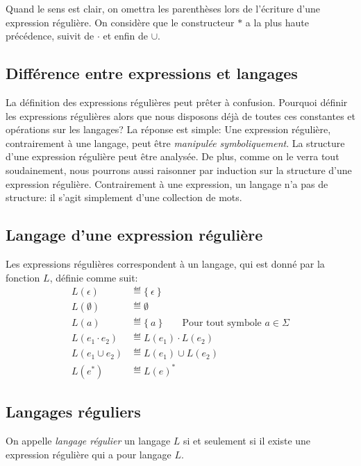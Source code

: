 Quand le sens est clair, on omettra les parenthèses lors de l'écriture d'une expression régulière.
On considère que le constructeur $*$ a la plus haute précédence, suivit de $\cdot$ et enfin de $\cup$.

\subsection{Différence entre expressions et langages}

La définition des expressions régulières peut prêter à confusion.
Pourquoi définir les expressions régulières alors que nous disposons déjà de toutes ces constantes et opérations sur les langages?
La réponse est simple: Une expression régulière, contrairement à une langage, peut être \textit{manipulée symboliquement}.
La structure d'une expression régulière peut être analysée.
De plus, comme on le verra tout soudainement, nous pourrons aussi raisonner par induction sur la structure d'une expression régulière.
Contrairement à une expression, un langage n'a pas de structure: il s'agit simplement d'une collection de mots.

\subsection{Langage d'une expression régulière}

Les expressions régulières correspondent à un langage, qui est donné par la fonction $L$, définie comme suit:
\begin{align*}
L(\epsilon) &\eqdef \{\ \epsilon\ \}\\
L(\emptyset) &\eqdef \emptyset\\
L(a) &\eqdef \{\ a\ \} \hspace{2em}\text{Pour tout symbole $a \in \Sigma$}\\
L(e_1 \cdot e_2) &\eqdef L(e_1) \cdot L(e_2)\\
L(e_1 \cup e_2) &\eqdef L(e_1) \cup L(e_2)\\
L(e^*) &\eqdef L(e)^*
\end{align*}

\subsection{Langages réguliers}

On appelle \og \textit{langage régulier} \fg{} un langage $L$ si et seulement si il existe une expression régulière qui a pour langage $L$.

